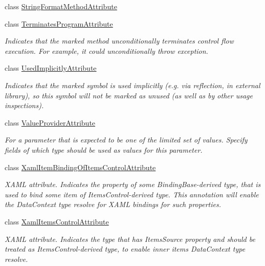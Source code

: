 \begin{DoxyCompactItemize}
class \mbox{\hyperlink{class_r_f_storage_1_1_string_format_method_attribute}{String\+Format\+Method\+Attribute}}
\item 
class \mbox{\hyperlink{class_r_f_storage_1_1_terminates_program_attribute}{Terminates\+Program\+Attribute}}
\begin{DoxyCompactList}\small\item\em Indicates that the marked method unconditionally terminates control flow execution. For example, it could unconditionally throw exception. \end{DoxyCompactList}\item 
class \mbox{\hyperlink{class_r_f_storage_1_1_used_implicitly_attribute}{Used\+Implicitly\+Attribute}}
\begin{DoxyCompactList}\small\item\em Indicates that the marked symbol is used implicitly (e.\+g. via reflection, in external library), so this symbol will not be marked as unused (as well as by other usage inspections). \end{DoxyCompactList}\item 
class \mbox{\hyperlink{class_r_f_storage_1_1_value_provider_attribute}{Value\+Provider\+Attribute}}
\begin{DoxyCompactList}\small\item\em For a parameter that is expected to be one of the limited set of values. Specify fields of which type should be used as values for this parameter. \end{DoxyCompactList}\item 
class \mbox{\hyperlink{class_r_f_storage_1_1_xaml_item_binding_of_items_control_attribute}{Xaml\+Item\+Binding\+Of\+Items\+Control\+Attribute}}
\begin{DoxyCompactList}\small\item\em X\+A\+ML attribute. Indicates the property of some {\ttfamily Binding\+Base}-\/derived type, that is used to bind some item of {\ttfamily Items\+Control}-\/derived type. This annotation will enable the {\ttfamily Data\+Context} type resolve for X\+A\+ML bindings for such properties. \end{DoxyCompactList}\item 
class \mbox{\hyperlink{class_r_f_storage_1_1_xaml_items_control_attribute}{Xaml\+Items\+Control\+Attribute}}
\begin{DoxyCompactList}\small\item\em X\+A\+ML attribute. Indicates the type that has {\ttfamily Items\+Source} property and should be treated as {\ttfamily Items\+Control}-\/derived type, to enable inner items {\ttfamily Data\+Context} type resolve. \end{DoxyCompactList}\end{DoxyCompactItemize}
